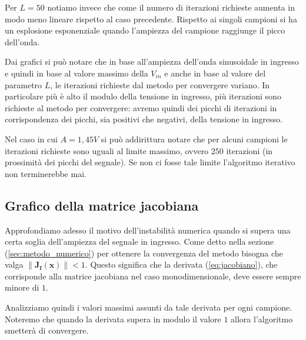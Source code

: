 			Per $L = 50$ notiamo invece che come il numero di iterazioni richieste aumenta in modo meno lineare rispetto al caso precedente. Rispetto ai singoli campioni si ha un esplosione esponenziale quando l'ampiezza del campione raggiunge il picco dell'onda.
			\graficospace
			\graficospace
			
			Dai grafici si può notare che in base all'ampiezza dell'onda sinusoidale in ingresso e quindi in base al valore massimo della $V_{in}$ e anche in base al valore del parametro $L$, le iterazioni richieste dal metodo per convergere variano. In particolare più è alto il modulo della tensione in ingresso, più iterazioni sono richieste al metodo per convergere: avremo quindi dei picchi di iterazioni in corrispondenza dei picchi, sia positivi che negativi, della tensione in ingresso.
			
			Nel caso in cui $A = 1,45V$ si può addirittura notare che per alcuni campioni le iterazioni richieste sono uguali al limite massimo, ovvero $250$ iterazioni (in prossimità dei picchi del segnale). Se non ci fosse tale limite l'algoritmo iterativo non terminerebbe mai.
			\pagebreak
			
		\subsection{Grafico della matrice jacobiana}
			Approfondiamo adesso il motivo dell'instabilità numerica quando si supera una certa soglia dell'ampiezza del segnale in ingresso. Come detto nella sezione (\ref{sec:metodo_numerico}) per ottenere la convergenza del metodo bisogna che valga $\lVert\mathbf{J_{f}(x)}\rVert < 1$. Questo significa che la derivata (\ref{eq:jacobiano}), che corrisponde alla matrice jacobiana nel caso monodimensionale, deve essere sempre minore di $1$.
			
			Analizziamo quindi i valori massimi assunti da tale derivata per ogni campione. Noteremo che quando la derivata supera in modulo il valore $1$ allora l'algoritmo smetterà di convergere.
			
			\graficospace
			\graficospace
			\graficospace
			

